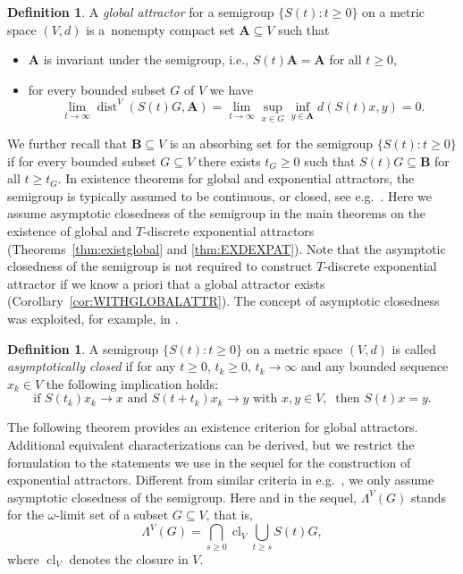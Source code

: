\documentclass[a4paper,12pt,reqno]{amsart}
\theoremstyle{plain}
\theoremstyle{definition}
\newtheorem{defn}[lem]{Definition}
\numberwithin{equation}{section}
\newcommand{\dist}{\operatorname{dist}}
\newcommand{\cl}{\operatorname{cl}}
\renewcommand{\geq}{\geqslant}
\begin{document}
\begin{defn}
A \emph{global attractor} for a semigroup $\{S(t)\colon t\geq 0\}$ on a metric space $(V,d)$ is a~nonempty compact set $\mathbf{A}\subseteq V$ such that
\begin{itemize}
\item[(i)] $\mathbf{A}$ is invariant under the semigroup, i.e., $S(t)\mathbf{A}=\mathbf{A}$ for all $t\geq 0,$
\item[(ii)] for every bounded subset $G$ of $V$ we have
$$\lim_{t\to\infty}\dist^{V}(S(t)G,\mathbf{A})=\lim_{t\to\infty}\sup_{x\in G}\inf_{y\in\mathbf{A}}d(S(t)x,y)=0.$$
\end{itemize}
\end{defn}

We further recall that $\mathbf{B}\subseteq V$ is an absorbing set for the semigroup $\{S(t)\colon t\geq 0\}$ if for every bounded subset $G\subseteq V$ there exists $t_G\geq 0$ such that 
$S(t)G\subseteq \mathbf{B}$ for all $t\geq t_G$.
In existence theorems for global and exponential attractors, the semigroup is typically assumed to be continuous, or closed, see e.g.~\cite{PaZe,Pra03b,CaSo}. Here we assume asymptotic closedness of the semigroup in the main theorems on the existence of global and $T$-discrete exponential attractors (Theorems~\ref{thm:existglobal} and \ref{thm:EXDEXPAT}). Note that the asymptotic closedness of the semigroup is not required to construct $T$-discrete exponential attractor if we know a priori that a global attractor exists (Corollary~\ref{cor:WITHGLOBALATTR}). The concept of asymptotic closedness was exploited, for example, in \cite{cholewarodriguezbernal10}.

\begin{defn}
A semigroup $\{S(t)\colon t\geq 0\}$ on a metric space $(V,d)$ is called \emph{asymptotically closed}
if for any $t\geq 0$, $t_{k}\geq 0$, $t_{k}\to\infty$ and any bounded sequence $x_k\in V$
the following implication holds:
$$\text{if }S(t_k)x_k\to x\text{ and }S(t+t_k)x_{k}\to y\text{ with }x,y\in V,\  
\text{ then }S(t)x=y.$$
\end{defn}

The following theorem provides an existence criterion for global attractors. Additional equivalent characterizations can be derived, but we restrict the formulation to the statements we use in the sequel for the construction of exponential attractors.
Different from similar criteria in e.g.~\cite{chueshov}, we only assume asymptotic closedness of the semigroup. 
Here and in the sequel, $\Lambda^{V}(G)$ stands for the $\omega$-limit set of a subset $G\subseteq V$, that is, 
$$\Lambda^{V}(G)=\bigcap_{s\geq 0}\cl_{V}\bigcup_{t\geq s}S(t)G,$$
where $\cl_V$ denotes the closure in $V$.
\end{document}
